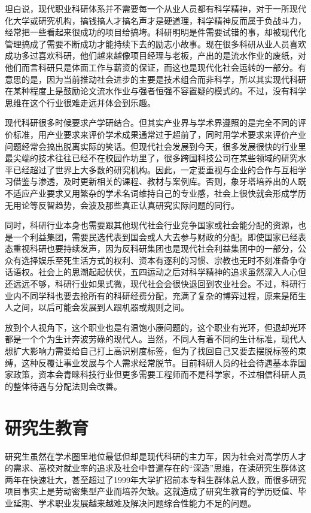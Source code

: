 \documentclass[]{tufte-book}
\begin{document}
坦白说，现代职业科研体系并不需要每一个从业人员都有科学精神，对于一所现代化大学或研究机构，搞钱搞人才搞名声才是硬道理，科学精神反而属于负战斗力，经常把一些看起来很成功的项目给搞垮。科研明明是件需要试错的事，却被现代化管理搞成了需要不断成功才能持续下去的励志小故事。现在很多科研从业人员喜欢成功多过喜欢科研，他们越来越像项目经理与老板，产出的是流水作业的废纸，对他们而言科研只是体面工作与薪资的保证，而这也是现代化社会运转的一部分。有意思的是，因为当前推动社会进步的主要是技术组合而非科学，所以其实现代科研在某种程度上是鼓励论文流水作业与强者恒强不容置疑的模式的。不过，没有科学思维在这个行业很难走远并体会到乐趣。

现代科研很多时候要求产学研结合。但其实产业界与学术界遵照的是完全不同的评价标准，用产业要求来评价学术成果通常过于超前了，同时用学术要求来评价产业问题经常会搞出脱离实际的笑话。但现代社会发展到今天，很多发展很快的行业里最尖端的技术往往已经不在校园作坊里了，很多跨国科技公司在某些领域的研究水平已经超过了世界上大多数的研究机构。因此，一定要重视与企业的合作与互相学习借鉴与渗透，及时更新相关的课程、教材与案例库。否则，象牙塔培养出的人既不适应产业要求又用繁杂的学术名词维持自己的专业感，社会上很快就会形成学历无用论等反智趋势，会波及那些真正认真研究实际问题的同行。

同时，科研行业本身也需要跟其他现代社会行业竞争国家或社会能分配的资源，也是一个利益集团，需要民选代表到国会或人大去参与财政的分配。即使国家已经表态重视科研也要持续发声，因为反科研集团也是现代社会利益集团中的一部分，公众有选择娱乐至死生活方式的权利、资本有逐利的习惯、宗教也无时不刻准备争夺话语权。社会上的思潮起起伏伏，五四运动之后对科学精神的追求虽然深入人心但还远远不够，科研行业如果式微，现代社会会很快退回到农业社会。不过，科研行业内不同学科也要去抢所有的科研经费分配，充满了复杂的博弈过程，原来是陌生人之间，以后可能会发展到人跟机器或规则之间。

放到个人视角下，这个职业也是有温饱小康问题的，这个职业有光环，但退却光环都是一个个为生计奔波劳碌的现代人。当然，不同人有着不同的生计标准，现代人想扩大影响力需要给自己打上高识别度标签，但为了找回自己又要去摆脱标签的束缚，这种反覆让事业发展与个人需求经常脱节。目前科研人员的社会待遇基本靠国家政策，资本会青睐科技行业但更多需要工程师而不是科学家，不过相信科研人员的整体待遇与分配法则会改善。

\hypertarget{ux7814ux7a76ux751fux6559ux80b2}{%
\section{研究生教育}\label{ux7814ux7a76ux751fux6559ux80b2}}

研究生虽然在学术圈里地位最低但却是现代科研的主力军，因为社会对高学历人才的需求、高校对就业率的追求及社会中普遍存在的``深造''思维，在读研究生群体这两年在快速壮大，甚至超过了1999年大学扩招前本专科生群体总人数，而很多研究项目事实上是劳动密集型产业而培养欠缺。这就造成了研究生教育的学历贬值、毕业延期、学术职业发展越来越难及解决问题综合性能力不足的问题。
\end{document}
